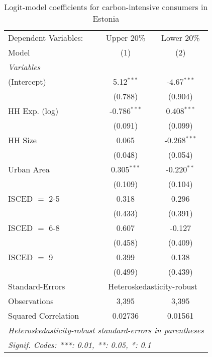 
\begin{table}[htbp!]
   \centering
   \small
   \begin{adjustbox}{width = 1\textwidth, max height = 0.95\textheight, center}
      \begin{threeparttable}[b]
         \caption{\label{tab:Logit_1_EST} Logit-model coefficients for carbon-intensive consumers in Estonia}
         \begin{tabular}{lcc}
            \tabularnewline \midrule \midrule
            Dependent Variables: & Upper 20\%     & Lower 20\%\\   
            Model                & (1)            & (2)\\  
            \midrule
            \emph{Variables}\\
            (Intercept)          & 5.12$^{***}$   & -4.67$^{***}$\\   
                                 & (0.788)        & (0.904)\\   
            HH Exp. (log)        & -0.786$^{***}$ & 0.408$^{***}$\\   
                                 & (0.091)        & (0.099)\\   
            HH Size              & 0.065          & -0.268$^{***}$\\   
                                 & (0.048)        & (0.054)\\   
            Urban Area           & 0.305$^{***}$  & -0.220$^{**}$\\   
                                 & (0.109)        & (0.104)\\   
            ISCED $=$ 2-5        & 0.318          & 0.296\\   
                                 & (0.433)        & (0.391)\\   
            ISCED $=$ 6-8        & 0.607          & -0.127\\   
                                 & (0.458)        & (0.409)\\   
            ISCED $=$ 9          & 0.399          & 0.138\\   
                                 & (0.499)        & (0.439)\\   
            \midrule 
            Standard-Errors & \multicolumn{2}{c}{Heteroskedasticity-robust} \\ 
            Observations         & 3,395          & 3,395\\  
            Squared Correlation  & 0.02736        & 0.01561\\  
            \midrule \midrule
            \multicolumn{3}{l}{\emph{Heteroskedasticity-robust standard-errors in parentheses}}\\
            \multicolumn{3}{l}{\emph{Signif. Codes: ***: 0.01, **: 0.05, *: 0.1}}\\
         \end{tabular}
         

\end{threeparttable}
\end{adjustbox}
\end{table}
